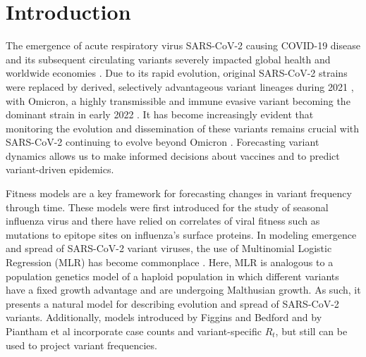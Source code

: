 \documentclass[10pt,letterpaper]{article}
\begin{document}
\linenumbers

\section*{Introduction}

The emergence of acute respiratory virus SARS-CoV-2 causing COVID-19 disease and its subsequent circulating variants severely impacted global health and worldwide economies \cite{onyeaka2021covid19}.
Due to its rapid evolution, original SARS-CoV-2 strains were replaced by derived, selectively advantageous variant lineages during 2021 \cite{campbell2021increased}, with Omicron, a highly transmissible and immune evasive variant becoming the dominant strain in early 2022 \cite{viana2022rapid}.
It has become increasingly evident that monitoring the evolution and dissemination of these variants remains crucial with SARS-CoV-2 continuing to evolve beyond Omicron \cite{carabelli2023sarscov2}.
Forecasting variant dynamics allows us to make informed decisions about vaccines and to predict variant-driven epidemics.

Fitness models are a key framework for forecasting changes in variant frequency through time.
These models were first introduced for the study of seasonal influenza virus \cite{luksza2014predictive, morris2018predictive, huddleston2020integrating} and there have relied on correlates of viral fitness such as mutations to epitope sites on influenza's surface proteins.
In modeling emergence and spread of SARS-CoV-2 variant viruses, the use of Multinomial Logistic Regression (MLR) has become commonplace \cite{annavajhala2021emergence, faria2021genomics, obermeyer2022analysis, susswein2023early}.
Here, MLR is analogous to a population genetics model of a haploid population in which different variants have a fixed growth advantage and are undergoing Malthusian growth.
As such, it presents a natural model for describing evolution and spread of SARS-CoV-2 variants.
Additionally, models introduced by Figgins and Bedford \cite{figgins2022sars} and by Piantham et al \cite{piantham2021estimating} incorporate case counts and variant-specific $R_t$, but still can be used to project variant frequencies.
\end{document}
